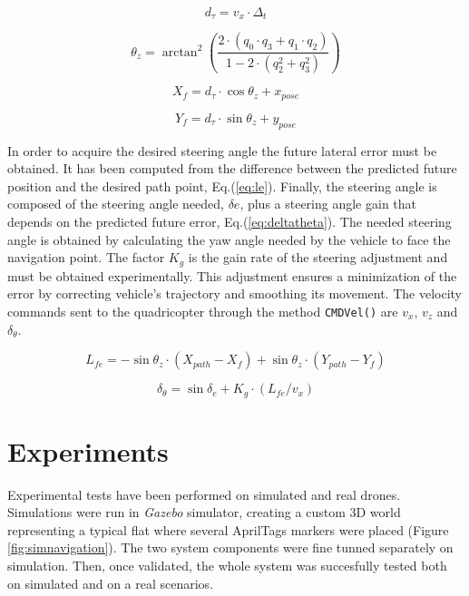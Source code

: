 \documentclass{styles/svproc}
\begin{document}
	\begin{equation}
	d_{\tau} = v_{x} \cdot \Delta_{t}
	\label{eq:dtau}
	\end{equation}

	\begin{equation}
	\theta_{z} = \arctan^2 \left( \frac{2 \cdot (q_{0} \cdot q_{3} +q_{1} \cdot q_{2})}{1-2 \cdot (q_{2}^2 + q_{3}^2)}\right)
	\label{eq:euler}
	\end{equation}		
	
	\begin{equation}
	X_{f} = d_{\tau} \cdot \cos \theta_{z} + x_{pose}
	\label{eq:xf}
	\end{equation}
	
	\begin{equation}
	Y_{f} = d_{\tau} \cdot \sin \theta_{z} + y_{pose}
	\label{eq:yf}
	\end{equation}
	
	In order to acquire the desired steering angle the future lateral error must be obtained. It has been computed from the difference between the predicted future position and the desired path point, Eq.(\ref{eq:le}). Finally, the steering angle is composed of the steering angle needed, $\delta{e}$, plus a steering angle gain that depends on the predicted future error, Eq.(\ref{eq:deltatheta}). The needed steering angle is obtained by calculating the yaw angle needed by the vehicle to face the navigation point. The factor $K_{g}$ is the gain rate of the steering adjustment and must be obtained experimentally. This adjustment ensures a minimization of the error by correcting vehicle's trajectory and smoothing its movement. The velocity commands sent to the quadricopter through the method \texttt{CMDVel()} are $v_{x}$, $v_{z}$ and $\delta_{\theta}$. 

	\begin{equation}
	L_{fe} = - \sin \theta_{z} \cdot ( X_{path} - X_{f} ) + \sin \theta_{z} \cdot ( Y_{path} - Y_{f} )
	\label{eq:le}
	\end{equation}

	\begin{equation}
	\delta_{\theta} = \sin \delta_{e} +  K_{g} \cdot ( L_{fe} / v_{x} )
	\label{eq:deltatheta}
	\end{equation}

\section{Experiments}

        Experimental tests have been performed on simulated and real drones. Simulations were run in \textit{Gazebo} simulator, creating a custom 3D world representing a typical flat where several AprilTags markers were placed (Figure \ref{fig:simnavigation}). The two system components were fine tunned separately on simulation. Then, once validated, the whole system was succesfully tested both on simulated and on a real scenarios.
        
\end{document}

